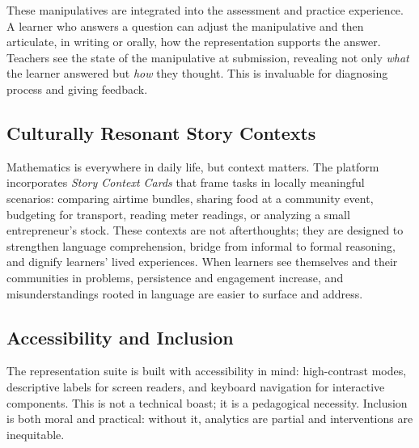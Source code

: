These manipulatives are integrated into the assessment and practice experience. A learner who answers a question can adjust the manipulative and then articulate, in writing or orally, how the representation supports the answer. Teachers see the state of the manipulative at submission, revealing not only \emph{what} the learner answered but \emph{how} they thought. This is invaluable for diagnosing process and giving feedback.

\subsection{Culturally Resonant Story Contexts}

Mathematics is everywhere in daily life, but context matters. The platform incorporates \emph{Story Context Cards} that frame tasks in locally meaningful scenarios: comparing airtime bundles, sharing food at a community event, budgeting for transport, reading meter readings, or analyzing a small entrepreneur's stock. These contexts are not afterthoughts; they are designed to strengthen language comprehension, bridge from informal to formal reasoning, and dignify learners' lived experiences. When learners see themselves and their communities in problems, persistence and engagement increase, and misunderstandings rooted in language are easier to surface and address.

\subsection{Accessibility and Inclusion}

The representation suite is built with accessibility in mind: high-contrast modes, descriptive labels for screen readers, and keyboard navigation for interactive components. This is not a technical boast; it is a pedagogical necessity. Inclusion is both moral and practical: without it, analytics are partial and interventions are inequitable.

